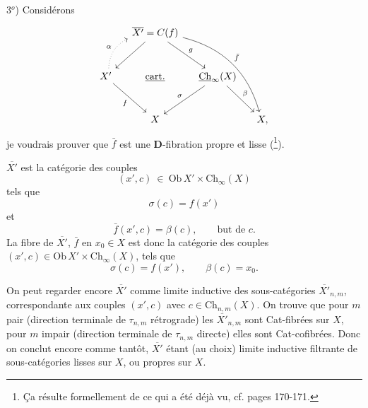 \documentclass[11pt]{article}
\newcommand{\printedpage}[1]{\marginpar{\footnotesize p.~#1}}
\newcommand{\msp}[1]{\marginpar{\footnotesize [#1]}}
\newcommand{\Ch}{\underline{\mathrm{Ch}}}
\newcommand{\Xb}{\overline{X'}}
\begin{document}
3$^o$) Considérons
\[
\begin{tikzcd}[column sep=small, row sep=large]
 & \Xb = C(f) \arrow[dl] \arrow[dr, "g"] \arrow[ddrr, bend left, "\bar f"] & & \\
X' \arrow[ur, dotted, bend left, "\alpha"] \arrow[dr, "f"'] & \underline{\text{cart.}} & \Ch_\infty(X) \arrow[dl, "\sigma"'] \arrow[dr, "\beta"] & \\
 & X & & X,
\end{tikzcd}
\]
\msp{page 153}
je voudrais prouver que $\bar f$ est une \textbf{D}-fibration propre et lisse (\footnote[38]{Ça résulte formellement de ce qui a été déjà vu, cf. pages 170-171.}).

$\Xb$ est la catégorie des couples
\[
(x',c) \ \in \ \mathrm{Ob}\,X' \times \mathrm{Ch}_\infty(X)
\]
tels que
\[
\sigma(c) = f(x')
\]
et
\[
\bar f(x',c) = \beta(c), \qquad \text{but de } c.
\]
La fibre de $\Xb$, $\bar f$ en $x_0 \in X$ est donc la catégorie des couples $(x',c) \in \mathrm{Ob}\,X' \times \mathrm{Ch}_\infty(X)$, tels que
\[
\sigma(c) = f(x'), \qquad \beta(c) = x_0.
\]

\printedpage{96}
On peut regarder encore $\Xb$ comme limite inductive des sous-catégories $\Xb_{n,m}$, correspondante aux couples $(x',c)$ avec $c \in \mathrm{Ch}_{n,m}(X)$. On trouve que pour $m$ pair (direction terminale de $\tau_{n,m}$ rétrograde) les $\Xb_{n,m}$ sont Cat-fibrées sur $X$, pour $m$ impair (direction terminale de $\tau_{n,m}$ directe) elles sont Cat-cofibrées. Donc on conclut encore comme tantôt, $\Xb$ étant (au choix) limite inductive filtrante de sous-catégories lisses sur $X$, ou propres sur $X$. %
\end{document}
